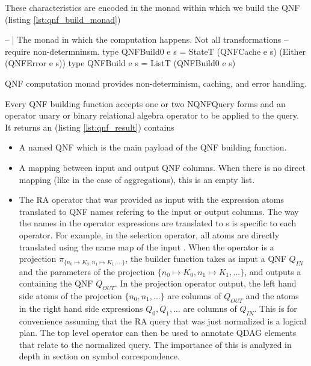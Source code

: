 These characteristics are encoded in the monad within which we build
the QNF (listing \ref{lst:qnf_build_monad})

\begin{code}
  \begin{haskellcode}
    -- | The monad in which the computation happens. Not all transformations
    -- require non-determninsm.
    type QNFBuild0 e s = StateT (QNFCache e s) (Either (QNFError e s))
    type QNFBuild e s = ListT (QNFBuild0 e s)
  \end{haskellcode}
  \caption{\label{lst:qnf_build_monad}QNF computation monad provides
    non-determinism, caching, and error handling.}
\end{code}

Every QNF building function accepts one or two {NQNFQuery} forms and an
operator unary or binary relational algebra operator to be applied to the query.
It returns an  (listing \ref{lst:qnf_result}) contains

\begin{itemize}
\item A  named QNF which is the main payload of the QNF building function.
\item A mapping between input and output QNF columns. When there is no direct mapping 
 (like in the case of aggregations), this is an empty list.
\item The RA operator that was provided as input with the expression atoms 
  translated to QNF names
  refering to the input or output columns. The way the names in the operator expressions are translated to
  s is specific to each operator. For example,
  in the selection operator, all atoms are directly translated
  using the name map of the input . When the operator is a
  projection \(\pi_{\{n_0 \mapsto K_0, n_1 \mapsto K_1, ...\}}\), the
  builder function takes as input a QNF \(Q_{IN}\) and the parameters of the projection
  \(\{n_0 \mapsto K_0, n_1 \mapsto K_1, ...\}\), and outputs a  containing the
  QNF \(Q_{OUT}\).
  In the projection operator output, the left hand side atoms of the projection \(\{n_0, n_1, ...\}\) are
  columns of \(Q_{OUT}\) and the atoms in the right hand side expressions \(Q_0,Q_1,...\) are columns of \(Q_{IN}\).
  This is for convenience assuming that the RA
  query that was just normalized is a logical plan. The top level
  operator can then be used to annotate QDAG elements that relate to
  the normalized query. The importance of this is analyzed in depth in
  section \label{sel:symbol_correspondence} on symbol correspondence.

\end{itemize}

